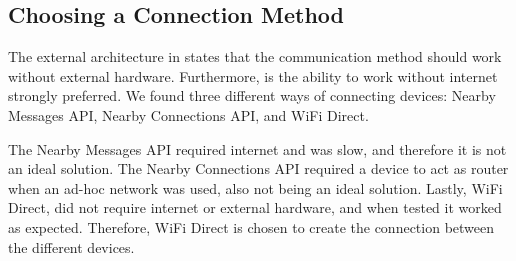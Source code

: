 \subsection{Choosing a Connection Method}
The external architecture in  states that the communication method should work without external hardware.
Furthermore, is the ability to work without internet strongly preferred.
We found three different ways of connecting devices: Nearby Messages API, Nearby Connections API, and WiFi Direct.

The Nearby Messages API required internet and was slow, and therefore it is not an ideal solution.
The Nearby Connections API required a device to act as router when an ad-hoc network was used, also not being an ideal solution.
Lastly, WiFi Direct, did not require internet or external hardware, and when tested it worked as expected.
Therefore, WiFi Direct is chosen to create the connection between the different devices.
